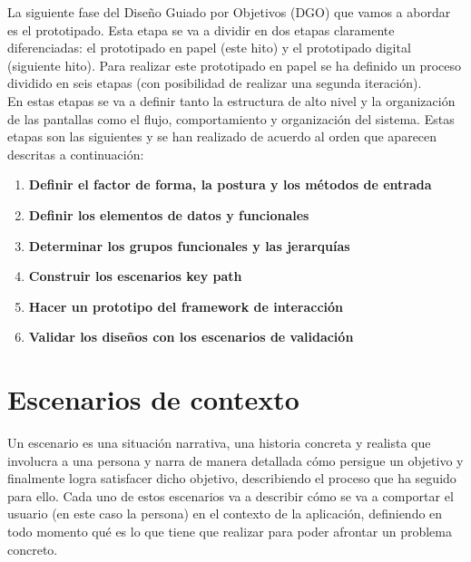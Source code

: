 
La siguiente fase del Diseño Guiado por Objetivos (DGO) que vamos a abordar es el prototipado. Esta etapa se va a dividir en dos etapas claramente diferenciadas:
el prototipado en papel (este hito) y el prototipado digital (siguiente hito). Para realizar este prototipado en papel se ha definido un proceso dividido en seis
etapas (con posibilidad de realizar una segunda iteración). \\

En estas etapas se va a definir tanto la estructura de alto nivel y la organización de las pantallas como el flujo, comportamiento y organización del sistema. Estas
etapas son las siguientes y se han realizado de acuerdo al orden que aparecen descritas a continuación:
\begin{enumerate}
    \item \textbf{Definir el factor de forma, la postura y los métodos de entrada}
    \item \textbf{Definir los elementos de datos y funcionales}
    \item \textbf{Determinar los grupos funcionales y las jerarquías}
    \item \textbf{Construir los escenarios key path}
    \item \textbf{Hacer un prototipo del framework de interacción}
    \item \textbf{Validar los diseños con los escenarios de validación}
\end{enumerate}

\section{Escenarios de contexto}
Un escenario es una situación narrativa, una historia concreta y realista que involucra a una persona y narra de manera detallada cómo persigue un objetivo y
finalmente logra satisfacer dicho objetivo, describiendo el proceso que ha seguido para ello. Cada uno de estos escenarios va a describir cómo se va a comportar
el usuario (en este caso la persona) en el contexto de la aplicación, definiendo en todo momento qué es lo que tiene que realizar para poder afrontar un problema
concreto.
